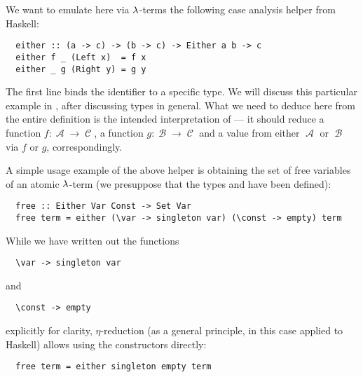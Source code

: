 \begin{example}
\begin{thmenum}
    We want to emulate here via \( \mathrm{\lambda} \)-terms the following case analysis helper from Haskell:
    \begin{verbatim}
  either :: (a -> c) -> (b -> c) -> Either a b -> c
  either f _ (Left x)  = f x
  either _ g (Right y) = g y
    \end{verbatim}\vspace{-\baselineskip}

    The first line binds the identifier  to a specific type. We will discuss this particular example in , after discussing types in general. What we need to deduce here from the entire definition is the intended interpretation of  --- it should reduce a function \( f: \mscrA \to \mscrC \), a function \( g: \mscrB \to \mscrC \) and a value from either \( \mscrA \) or \( \mscrB \) via \( f \) or \( g \), correspondingly.

    A simple usage example of the above helper is obtaining the set of free variables of an atomic \( \mathrm{\lambda} \)-term (we presuppose that the types  and  have been defined):
    \begin{verbatim}
  free :: Either Var Const -> Set Var
  free term = either (\var -> singleton var) (\const -> empty) term
    \end{verbatim}\vspace{-\baselineskip}

    While we have written out the functions
    \begin{verbatim}
  \var -> singleton var
    \end{verbatim}\vspace{-\baselineskip}
    and
    \begin{verbatim}
  \const -> empty
    \end{verbatim}\vspace{-\baselineskip}
    explicitly for clarity, \( \eta \)-reduction (as a general principle, in this case applied to Haskell) allows using the  constructors directly:
    \begin{verbatim}
  free term = either singleton empty term
    \end{verbatim}\vspace{-\baselineskip}


\end{thmenum}
\end{example}
